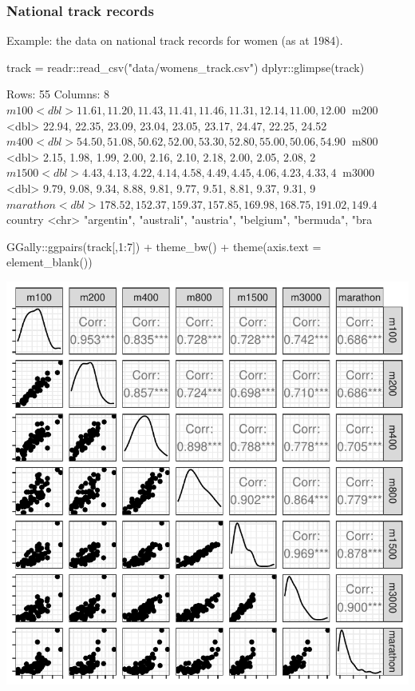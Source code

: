 \documentclass[a4paper]{article}\usepackage[]{graphicx}\usepackage[]{xcolor}
\makeatletter
\def\maxwidth{ %
  \ifdim\Gin@nat@width>\linewidth
    \linewidth
  \else
    \Gin@nat@width
  \fi
}
\makeatother
\begin{document}
\subsubsection{National track records}
Example: the data on national track records for women (as at 1984).
\begin{Schunk}
\begin{Sinput}
track = readr::read_csv("data/womens_track.csv")
dplyr::glimpse(track)
\end{Sinput}
\begin{Soutput}
Rows: 55
Columns: 8
$ m100     <dbl> 11.61, 11.20, 11.43, 11.41, 11.46, 11.31, 12.14, 11.00, 12.00~
$ m200     <dbl> 22.94, 22.35, 23.09, 23.04, 23.05, 23.17, 24.47, 22.25, 24.52~
$ m400     <dbl> 54.50, 51.08, 50.62, 52.00, 53.30, 52.80, 55.00, 50.06, 54.90~
$ m800     <dbl> 2.15, 1.98, 1.99, 2.00, 2.16, 2.10, 2.18, 2.00, 2.05, 2.08, 2~
$ m1500    <dbl> 4.43, 4.13, 4.22, 4.14, 4.58, 4.49, 4.45, 4.06, 4.23, 4.33, 4~
$ m3000    <dbl> 9.79, 9.08, 9.34, 8.88, 9.81, 9.77, 9.51, 8.81, 9.37, 9.31, 9~
$ marathon <dbl> 178.52, 152.37, 159.37, 157.85, 169.98, 168.75, 191.02, 149.4~
$ country  <chr> "argentin", "australi", "austria", "belgium", "bermuda", "bra~
\end{Soutput}
\begin{Sinput}
GGally::ggpairs(track[,1:7]) + theme_bw() + theme(axis.text = element_blank())
\end{Sinput}


{\centering \includegraphics[width=\maxwidth]{figure/listings-unnamed-chunk-486-1} 

}

\end{Schunk}
\end{document}
